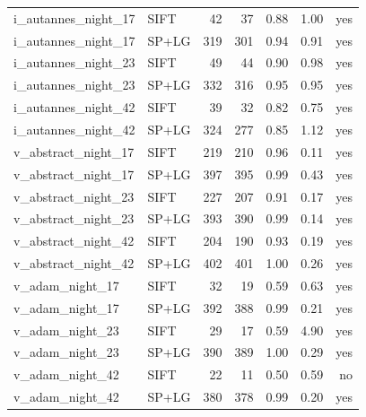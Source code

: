 \begin{longtable}{llrrrrr}
i\_autannes\_night\_17 & SIFT & 42 & 37 & 0.88 & 1.00 & yes \\
i\_autannes\_night\_17 & SP+LG & 319 & 301 & 0.94 & 0.91 & yes \\
i\_autannes\_night\_23 & SIFT & 49 & 44 & 0.90 & 0.98 & yes \\
i\_autannes\_night\_23 & SP+LG & 332 & 316 & 0.95 & 0.95 & yes \\
i\_autannes\_night\_42 & SIFT & 39 & 32 & 0.82 & 0.75 & yes \\
i\_autannes\_night\_42 & SP+LG & 324 & 277 & 0.85 & 1.12 & yes \\
v\_abstract\_night\_17 & SIFT & 219 & 210 & 0.96 & 0.11 & yes \\
v\_abstract\_night\_17 & SP+LG & 397 & 395 & 0.99 & 0.43 & yes \\
v\_abstract\_night\_23 & SIFT & 227 & 207 & 0.91 & 0.17 & yes \\
v\_abstract\_night\_23 & SP+LG & 393 & 390 & 0.99 & 0.14 & yes \\
v\_abstract\_night\_42 & SIFT & 204 & 190 & 0.93 & 0.19 & yes \\
v\_abstract\_night\_42 & SP+LG & 402 & 401 & 1.00 & 0.26 & yes \\
v\_adam\_night\_17 & SIFT & 32 & 19 & 0.59 & 0.63 & yes \\
v\_adam\_night\_17 & SP+LG & 392 & 388 & 0.99 & 0.21 & yes \\
v\_adam\_night\_23 & SIFT & 29 & 17 & 0.59 & 4.90 & yes \\
v\_adam\_night\_23 & SP+LG & 390 & 389 & 1.00 & 0.29 & yes \\
v\_adam\_night\_42 & SIFT & 22 & 11 & 0.50 & 0.59 & no \\
v\_adam\_night\_42 & SP+LG & 380 & 378 & 0.99 & 0.20 & yes \\
\end{longtable}\endgroup
